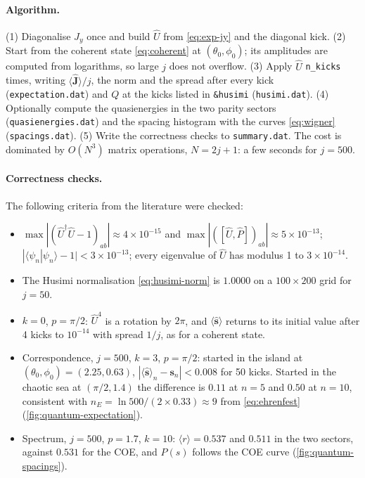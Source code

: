 \documentclass[11pt,a4paper]{article}
\newcommand{\vJ}{\bm{J}}
\begin{document}
\paragraph{Algorithm.} (1) Diagonalise $\hat J_y$ once and build $\hat U$ from \eqref{eq:exp-jy} and the diagonal kick.
(2) Start from the coherent state \eqref{eq:coherent} at $(\theta_0,\phi_0)$; its amplitudes are computed from
logarithms, so large $j$ does not overflow. (3) Apply $\hat U$ \texttt{n\_kicks} times, writing
$\langle\hat{\vJ}\rangle/j$, the norm and the spread after every kick (\texttt{expectation.dat}) and $Q$ at the kicks
listed in \texttt{\&husimi} (\texttt{husimi.dat}). (4) Optionally compute the quasienergies in the two parity sectors
(\texttt{quasienergies.dat}) and the spacing histogram with the curves \eqref{eq:wigner} (\texttt{spacings.dat}).
(5) Write the correctness checks to \texttt{summary.dat}. The cost is dominated by $O(N^3)$ matrix operations,
$N = 2j+1$: a few seconds for $j = 500$.

\paragraph{Correctness checks.} The following criteria from the literature \cite{Haake,HKS1987,Atas2013} were checked:
\begin{itemize}
  \item $\max|(\hat U^\dagger\hat U - 1)_{ab}| \approx 4\times10^{-15}$ and $\max|([\hat U,\hat P])_{ab}| \approx
  5\times10^{-13}$; $|\langle\psi_n|\psi_n\rangle - 1| < 3\times10^{-13}$; every eigenvalue of $\hat U$ has modulus 1
  to $3\times10^{-14}$.
  \item The Husimi normalisation \eqref{eq:husimi-norm} is $1.0000$ on a $100\times200$ grid for $j = 50$.
  \item $k = 0$, $p = \pi/2$: $\hat U^4$ is a rotation by $2\pi$, and $\langle\hat{\bm s}\rangle$ returns to its initial
  value after 4 kicks to $10^{-14}$ with spread $1/j$, as for a coherent state.
  \item Correspondence, $j = 500$, $k = 3$, $p=\pi/2$: started in the island at $(\theta_0,\phi_0) = (2.25, 0.63)$,
  $|\langle\hat{\bm s}\rangle_n - \bm s_n| < 0.008$ for 50 kicks. Started in the chaotic sea at $(\pi/2, 1.4)$ the
  difference is $0.11$ at $n = 5$ and $0.50$ at $n = 10$, consistent with $n_E = \ln 500/(2\times0.33) \approx 9$
  from \eqref{eq:ehrenfest} (\cref{fig:quantum-expectation}).
  \item Spectrum, $j = 500$, $p = 1.7$, $k = 10$: $\langle r\rangle = 0.537$ and $0.511$ in the two sectors,
  against $0.531$ for the COE, and $P(s)$ follows the COE curve (\cref{fig:quantum-spacings}).
\end{itemize}
\end{document}
